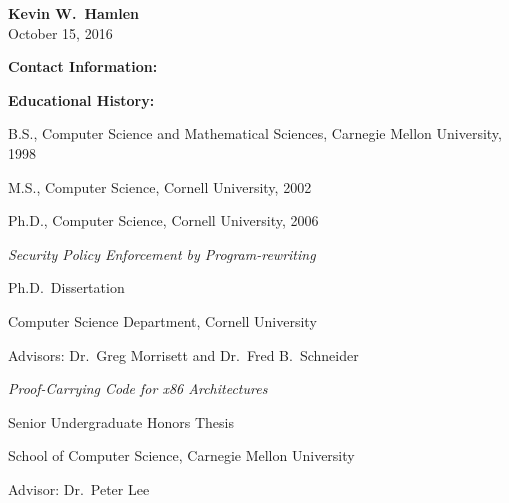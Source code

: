 \documentclass[doublespacing]{utdthesis}
\begin{document}
\begin{vita}  %


  \begin{center}
    {\LARGE\bfseries Kevin W.~Hamlen} \\[5pt]
    October 15, 2016
  \end{center}

  \bigskip

  {\large\bfseries Contact Information:\par}
  \medskip
  \noindent{}
  \hfil{}\par

  \bigskip

  {\large\bfseries Educational History:\par}
  \medskip
  B.S., Computer Science and Mathematical Sciences,
    Carnegie Mellon University, 1998\par
  M.S., Computer Science, Cornell University, 2002\par
  Ph.D., Computer Science, Cornell University, 2006\par
  \medskip
  \textit{Security Policy Enforcement by Program-rewriting}\par
  Ph.D.~Dissertation\par
  Computer Science Department, Cornell University\par
  Advisors: Dr.~Greg Morrisett and Dr.~Fred B.~Schneider\par
  \medskip
  \textit{Proof-Carrying Code for x86 Architectures}\par
  Senior Undergraduate Honors Thesis\par
  School of Computer Science, Carnegie Mellon University\par
  Advisor: Dr.~Peter Lee


\end{vita}
\end{document}

